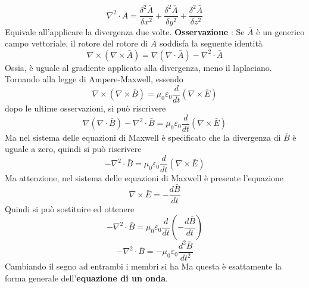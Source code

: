\documentclass[10pt, letterpaper]{report}
\begin{document}
$$\nabla^2\cdot\bar A = \frac{\delta^2\bar A}{\delta x^2}+\frac{\delta^2\bar A}{\delta y^2}+\frac{\delta^2\bar A}{\delta z^2} $$
Equivale all'applicare la divergenza due volte.\acc 
\textbf{Osservazione} : Se $\bar A$ è un generico campo vettoriale, il rotore del rotore di $\bar A$ soddisfa la seguente identità 
$$\nabla \times (\nabla \times \bar A )=\nabla(\nabla \cdot \bar A)-\nabla^2\cdot \bar A $$
Ossia, è uguale al gradiente applicato alla divergenza, meno il laplaciano. Tornando alla legge di Ampere-Maxwell, essendo 
$$\nabla \times(\nabla \times \bar B )= \mu_0 \varepsilon_0 \dfrac{d}{dt}(\nabla \times \bar E)$$
dopo le ultime osservazioni, si può riscrivere 
$$ \nabla(\nabla \cdot \bar B)-\nabla^2\cdot \bar B=\mu_0 \varepsilon_0 \dfrac{d}{dt}(\nabla \times \bar E)$$ 
Ma nel sistema delle equazioni di Maxwell è specificato che la divergenza di $\bar B$ è uguale a zero, quindi si può riscrivere 
$$ -\nabla^2\cdot \bar B=\mu_0 \varepsilon_0 \dfrac{d}{dt}(\nabla \times \bar E)$$ 
Ma attenzione, nel sistema delle equazioni di Maxwell è presente l'equazione
$$\nabla \times \bar E = -\dfrac{d\bar B }{dt}$$ 
Quindi si può sostituire ed ottenere 
$$ -\nabla^2\cdot \bar B=\mu_0 \varepsilon_0 \dfrac{d}{dt}(-\dfrac{d\bar B }{dt})$$ 
$$ -\nabla^2\cdot \bar B=-\mu_0 \varepsilon_0 \dfrac{d^2\bar B}{dt^2}$$ 
Cambiando il segno ad entrambi i membri si ha 
Ma questa è esattamente la forma generale dell'\textbf{equazione di un onda}.
\end{document}
